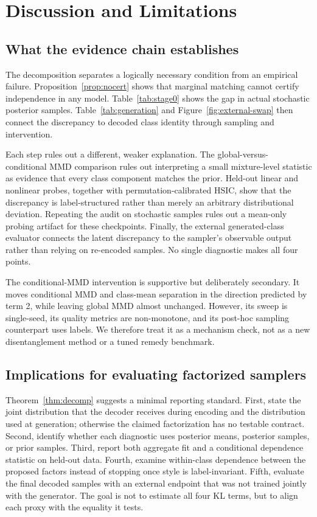 \documentclass{article}
\begin{document}
\section{Discussion and Limitations}
\label{sec:discussion}

\subsection{What the evidence chain establishes}

The decomposition separates a logically necessary condition from an
empirical failure.  Proposition~\ref{prop:nocert} shows that marginal matching
cannot certify independence in any model.  Table~\ref{tab:stage0} shows the
gap in actual stochastic posterior samples.  Table~\ref{tab:generation}
and Figure~\ref{fig:external-swap} then connect the discrepancy to decoded
class identity through sampling and intervention.

Each step rules out a different, weaker explanation.  The global-versus-
conditional MMD comparison rules out interpreting a small mixture-level
statistic as evidence that every class component matches the prior.  Held-out
linear and nonlinear probes, together with permutation-calibrated HSIC, show
that the discrepancy is label-structured rather than merely an arbitrary
distributional deviation.  Repeating the audit on stochastic samples rules
out a mean-only probing artifact for these checkpoints.  Finally, the
external generated-class evaluator connects the latent discrepancy to the
sampler's observable output rather than relying on re-encoded samples.  No
single diagnostic makes all four points.

The conditional-MMD intervention is supportive but deliberately secondary.
It moves conditional MMD and class-mean separation in the direction predicted
by term 2, while leaving global MMD almost unchanged.  However, its sweep is
single-seed, its quality metrics are non-monotone, and its post-hoc sampling
counterpart uses labels.  We therefore treat it as a mechanism check, not as
a new disentanglement method or a tuned remedy benchmark.

\subsection{Implications for evaluating factorized samplers}

Theorem~\ref{thm:decomp} suggests a minimal reporting standard.  First, state
the joint distribution that the decoder receives during encoding and the
distribution used at generation; otherwise the claimed factorization has no
testable contract.  Second, identify whether each diagnostic uses posterior
means, posterior samples, or prior samples.  Third, report both aggregate fit
and a conditional dependence statistic on held-out data.  Fourth, examine
within-class dependence between the proposed factors instead of stopping once
style is label-invariant.  Fifth, evaluate the final decoded samples with an
external endpoint that was not trained jointly with the generator.  The goal
is not to estimate all four KL terms, but to align each proxy with the
equality it tests.
\end{document}
